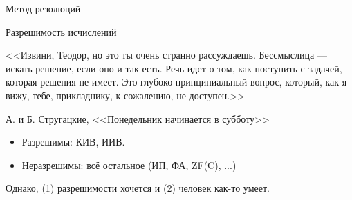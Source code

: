 \documentclass[handout]{beamer}
\begin{document}
\newcommand\doubleplus{+\kern-1.3ex+\kern0.8ex}
\newcommand\mdoubleplus{\ensuremath{\mathbin{+\mkern-10mu+}}}

\begin{frame}{}
\begin{center}\Large Метод резолюций \end{center}
\end{frame}

\begin{frame}{Разрешимость исчислений}
\footnotesize{\flushright <<Извини, Теодор, но это ты очень странно рассуждаешь. Бессмыслица — искать решение, если оно и так есть. 
Речь идет о том, как поступить с задачей, которая решения не имеет. 
Это глубоко принципиальный вопрос, который, как я вижу, тебе, прикладнику, к сожалению, не доступен.>>

\vspace{0.3cm}
А. и Б. Стругацкие, <<Понедельник начинается в субботу>>}

\vspace{1cm}\pause

\normalsize


\begin{itemize}
\item Разрешимы: КИВ, ИИВ.
\item Неразрешимы: всё остальное (ИП, ФА, ZF(C), ...)
\end{itemize}

\pause

\vspace{0.5cm}
\noindent Однако, (1) разрешимости хочется \pause и (2) человек как-то умеет.

\end{frame}
\end{document}
